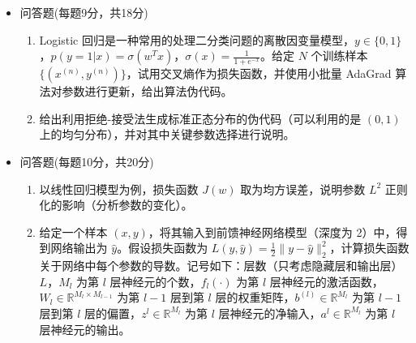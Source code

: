 \begin{itemize}
\item [三、] 问答题(每题9分，共18分)

\begin{enumerate}
    \item Logistic 回归是一种常用的处理二分类问题的离散因变量模型，$y \in \{0, 1\}$，$p(y = 1 | x) = \sigma(w^T x)$，$\sigma(x) = \frac{1}{1 + e^{-x}}$。给定 $N$ 个训练样本 $\{(x^{(n)}, y^{(n)})\}$，试用交叉熵作为损失函数，并使用小批量 AdaGrad 算法对参数进行更新，给出算法伪代码。
    \item 给出利用拒绝-接受法生成标准正态分布的伪代码（可以利用的是 $(0, 1)$ 上的均匀分布），并对其中关键参数选择进行说明。
\end{enumerate}

\item [四、] 问答题(每题10分，共20分)

\begin{enumerate}
    \item 以线性回归模型为例，损失函数 $J(w)$ 取为均方误差，说明参数 $L^2$ 正则化的影响（分析参数的变化）。
    \item 给定一个样本 $(x, y)$，将其输入到前馈神经网络模型（深度为 2）中，得到网络输出为 $\hat{y}$。假设损失函数为 $L(y, \hat{y}) = \frac{1}{2} \| y - \hat{y} \|_2^2$，计算损失函数关于网络中每个参数的导数。记号如下：层数（只考虑隐藏层和输出层）$L$，$M_l$ 为第 $l$ 层神经元的个数，$f_l(\cdot)$ 为第 $l$ 层神经元的激活函数，$W_l \in \mathbb{R}^{M_l \times M_{l-1}}$ 为第 $l-1$ 层到第 $l$ 层的权重矩阵，$b^{(l)} \in \mathbb{R}^{M_l}$ 为第 $l-1$ 层到第 $l$ 层的偏置，$z^l \in \mathbb{R}^{M_l}$ 为第 $l$ 层神经元的净输入，$a^l \in \mathbb{R}^{M_l}$ 为第 $l$ 层神经元的输出。
\end{enumerate}
\end{itemize}